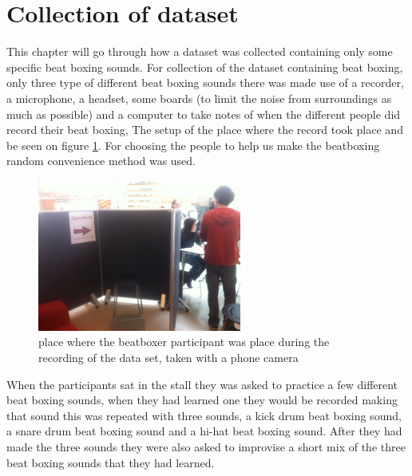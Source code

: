 \section{Collection of dataset}
This chapter will go through how a dataset was collected containing only some specific beat boxing sounds.
For collection of the dataset containing beat boxing, only three type of different beat boxing sounds there was made use of a recorder, a microphone, a headset, some boards (to limit the noise from surroundings as much as possible) and a computer to take notes of when the different people did record their beat boxing, The setup of the place where the record took place and be seen on figure \ref{data-collection-pic}. For choosing the people to help us make the beatboxing random convenience method was used. 
\begin{figure}[h]
	\begin{center}
		\includegraphics[height=5cm]{fig/dataset_collection.JPG}
		\caption{ place where the beatboxer participant was place during the recording of the data set, taken with a phone camera}
		\label{data-collection-pic}
	\end{center}
\end{figure}
When the participants sat in the stall they was asked to practice a few different beat boxing sounds, when they had learned one they would be recorded making that  sound this was repeated with three sounds, a kick drum beat boxing sound, a snare drum beat boxing sound and a hi-hat beat boxing sound. After they had made the three sounds they were also asked to improvise a short mix of the three beat boxing sounds that they had learned.
